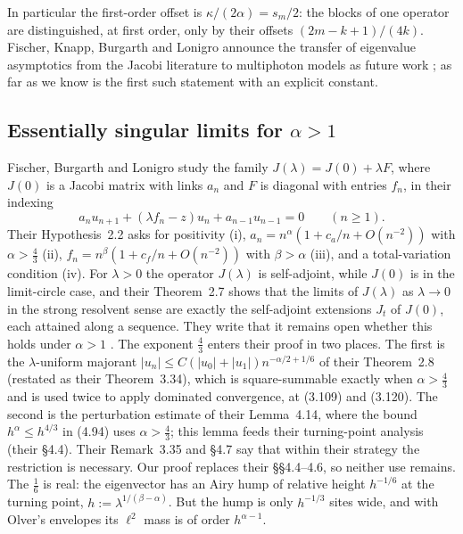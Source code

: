 In particular the first-order offset is $\kappa/(2\alpha)=s_m/2$: the blocks of one operator
are distinguished, at first order, only by their offsets $(2m-k+1)/(4k)$. Fischer, Knapp,
Burgarth and Lonigro announce the transfer of eigenvalue asymptotics from the Jacobi
literature to multiphoton models as future work \cite[p.~3]{FKBL2026}; as far as we know
 is the first such statement with an explicit constant.

\subsection{Essentially singular limits for \texorpdfstring{$\alpha>1$}{alpha > 1}}

Fischer, Burgarth and Lonigro \cite{FBL2026} study the family
$J(\lambda)=J(0)+\lambda F$, where $J(0)$ is a Jacobi matrix with links $a_n$ and $F$ is diagonal
with entries $f_n$, in their indexing
\begin{equation}\label{eq:fbl}
  a_nu_{n+1}+(\lambda f_n-z)u_n+a_{n-1}u_{n-1}=0\qquad(n\ge1).
\end{equation}
Their Hypothesis~2.2 asks for positivity (i), $a_n=n^\alpha(1+c_a/n+O(n^{-2}))$ with
$\alpha>\frac43$ (ii), $f_n=n^\beta(1+c_f/n+O(n^{-2}))$ with $\beta>\alpha$ (iii), and a
total-variation condition (iv). For $\lambda>0$ the operator $J(\lambda)$ is self-adjoint,
while $J(0)$ is in the limit-circle case, and their Theorem~2.7 shows that the limits of
$J(\lambda)$ as $\lambda\to0$ in the strong resolvent sense are exactly the self-adjoint extensions
$J_t$ of $J(0)$, each attained along a sequence. They write that it remains open whether
this holds under $\alpha>1$ \cite[\S4.7, p.~54]{FBL2026}. The exponent $\frac43$ enters their proof in
two places. The first is the $\lambda$-uniform majorant $|u_n|\le C(|u_0|+|u_1|)n^{-\alpha/2+1/6}$ of their
Theorem~2.8 (restated as their Theorem~3.34), which is square-summable exactly when $\alpha>\frac43$ and is
used twice to apply dominated convergence, at (3.109) and (3.120). The second is the perturbation
estimate of their Lemma~4.14, where the bound $h^\alpha\le h^{4/3}$ in (4.94) uses $\alpha>\frac43$; this lemma
feeds their turning-point analysis (their \S4.4). Their Remark~3.35 and \S4.7 say that within their
strategy the restriction is necessary. Our proof replaces their \S\S4.4--4.6, so neither use remains.
The $\frac16$ is real: the eigenvector has an Airy hump of relative
height $h^{-1/6}$ at the turning point, $h:=\lambda^{1/(\beta-\alpha)}$. But the hump is only
$h^{-1/3}$ sites wide, and with Olver's envelopes its $\ell^2$ mass is of order $h^{\alpha-1}$.

